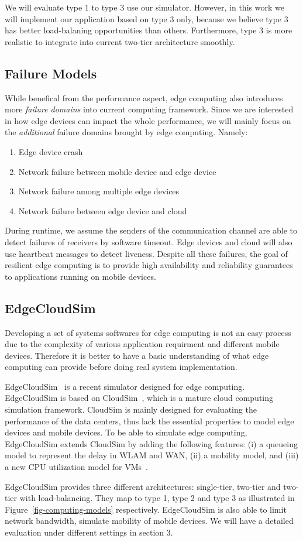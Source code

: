 We will evaluate type 1 to type 3 use our simulator. However, in this work we will implement our
application based on type 3 only, because we believe type 3 has better load-balaning opportunities
than others. Furthermore, type 3 is more realistic to integrate into current two-tier architecture smoothly.

\subsection{Failure Models}
\label{sec:failure-models}
While benefical from the performance aspect, edge computing also introduces more
{\em failure domains} into current computing framework. Since we are interested
in how edge devices can impact the whole performance, we will mainly focus on
the {\em additional} failure domains brought by edge computing. Namely:
\begin{enumerate}
\item Edge device crash
\item Network failure between mobile device and edge device
\item Network failure among multiple edge devices
\item Network failure between edge device and cloud
\end{enumerate}

During runtime, we assume the senders of the communication channel are able to detect failures
of receivers by software timeout. Edge devices and cloud will also use heartbeat
messages to detect liveness. Despite all these failures, the goal of resilient
edge computing is to provide high availability and reliability guarantees to
applications running on mobile devices.

\subsection{EdgeCloudSim}
Developing a set of systems softwares for edge computing is not an easy process due
to the complexity of various application requirment and different mobile devices.
Therefore it is better to have a basic understanding of what edge computing can provide
before doing real system implementation.

EdgeCloudSim~\cite{edgecloudsim} is a recent simulator designed for edge computing.
EdgeCloudSim is based on CloudSim~\cite{cloudsim}, which is a mature cloud computing simulation framework.
CloudSim is mainly designed for evaluating the performance of the data centers, thus lack the essential
properties to model edge devices and mobile devices. To be able to simulate edge computing, EdgeCloudSim
extends CloudSim by adding the following features: (i) a queueing model to represent the delay in WLAM and WAN,
(ii) a mobility model, and (iii) a new CPU utilization model for VMs~\cite{edgecloudsim}.

EdgeCloudSim provides three different architectures: single-tier, two-tier and two-tier with load-balancing.
They map to type 1, type 2 and type 3 as illustrated in Figure~\ref{fig-computing-models} respectively.
EdgeCloudSim is also able to limit network bandwidth, simulate mobility of mobile devices.
We will have a detailed evaluation under different settings in section 3.
